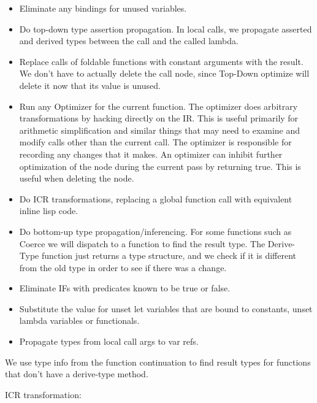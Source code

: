\begin{itemize}
\item Eliminate any bindings for unused variables.

\item Do top-down type assertion propagation.  In local calls, we propagate
asserted and derived types between the call and the called lambda.

\item
    Replace calls of foldable functions with constant arguments with the
    result.  We don't have to actually delete the call node, since Top-Down
    optimize will delete it now that its value is unused.
 
\item
   Run any Optimizer for the current function.  The optimizer does arbitrary
    transformations by hacking directly on the IR.  This is useful primarily
    for arithmetic simplification and similar things that may need to examine
    and modify calls other than the current call.  The optimizer is responsible
    for recording any changes that it makes.  An optimizer can inhibit further
    optimization of the node during the current pass by returning true.  This
    is useful when deleting the node.

\item
   Do ICR transformations, replacing a global function call with equivalent
    inline lisp code.

\item
    Do bottom-up type propagation/inferencing.  For some functions such as
    Coerce we will dispatch to a function to find the result type.  The
    Derive-Type function just returns a type structure, and we check if it is
    different from the old type in order to see if there was a change.

\item
    Eliminate IFs with predicates known to be true or false.

\item
    Substitute the value for unset let variables that are bound to constants,
    unset lambda variables or functionals.

\item
    Propagate types from local call args to var refs.
\end{itemize}

We use type info from the function continuation to find result types for
functions that don't have a derive-type method.


ICR transformation:


